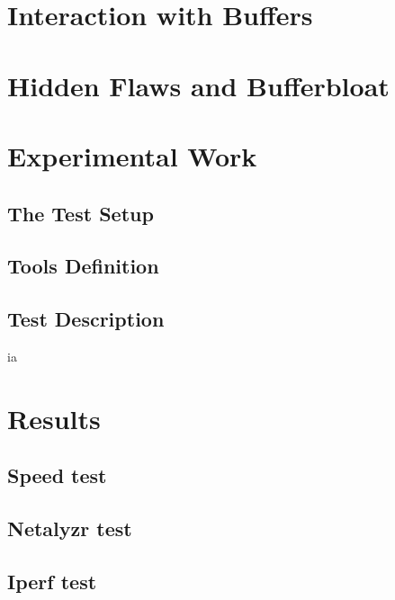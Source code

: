 \documentclass[letter, 11pt]{article}
\theoremstyle{plain}
\theoremstyle{definition}
\begin{document}
\newpage

\section{Interaction with Buffers}

\newpage
\section{Hidden Flaws and Bufferbloat}


\newpage

\section{Experimental Work}


\subsection{The Test Setup}


\subsection{Tools Definition}


\subsection{Test Description}

ia	
\newpage
\section{Results}


\subsection{Speed test}


\subsection{Netalyzr test}


\subsection{Iperf test}

\end{document}

